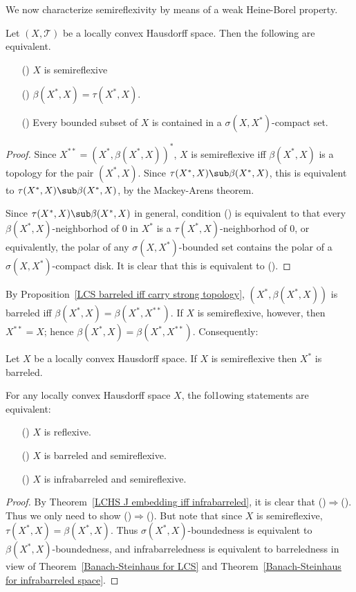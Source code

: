 We now characterize semireflexivity by means of a weak Heine-Borel property.
\begin{theorem}\label{LCHS semireflexive iff}
Let $(X,\mathcal{T})$ be a locally convex Hausdorff space. Then the following are equivalent.
\begin{itemize}
\item[(\rmnum{1})] $X$ is semireflexive
\item[(\rmnum{2})] $\beta(X^*,X)=\tau(X^*,X)$.
\item[(\rmnum{3})] Every bounded subset of $X$ is contained in a $\sigma(X,X^*)$-compact set.
\end{itemize}
\end{theorem}
\begin{proof}
Since $X^{**}=(X^*,\beta(X^*,X))^*$, $X$ is semireflexive iff $\beta(X^*,X)$ is a topology for the pair $(X^*,X)$. Since $\tau(X^*,X)\sub\beta(X^*,X)$, this is equivalent to $\tau(X^*,X)\sub\beta(X^*,X)$, by the Mackey-Arens theorem.\par
Since $\tau(X^*,X)\sub\beta(X^*,X)$ in general, condition () is equivalent to that every $\beta(X^*,X)$-neighborhod of $0$ in $X^*$ is a $\tau(X^*,X)$-neighborhod of $0$, or equivalently, the polar of any $\sigma(X,X^*)$-bounded set contains the polar of a $\sigma(X,X^*)$-compact disk. It is clear that this is equivalent to ().
\end{proof}
By Proposition~\ref{LCS barreled iff carry strong topology}, $(X^*,\beta(X^*,X))$ is barreled iff $\beta(X^*,X)=\beta(X^*,X^{**})$. If $X$ is semireflexive, however, then $X^{**}=X$; hence $\beta(X^*,X)=\beta(X^*,X^{**})$. Consequently:
\begin{corollary}\label{LCHS semireflexive X^* is barreled}
Let $X$ be a locally convex Hausdorff space. If $X$ is semireflexive then $X^*$ is barreled.
\end{corollary}
\begin{theorem}\label{LCHS reflexive iff}
For any locally convex Hausdorff space $X$, the fol1owing statements are equivalent:
\begin{itemize}
\item[(\rmnum{1})] $X$ is reflexive.
\item[(\rmnum{2})] $X$ is barreled and semireflexive.
\item[(\rmnum{3})] $X$ is infrabarreled and semireflexive.
\end{itemize}
\end{theorem}
\begin{proof}
By Theorem~\ref{LCHS J embedding iff infrabarreled}, it is clear that ()$\Rightarrow$(). Thus we only need to show ()$\Rightarrow$(). But note that since $X$ is semireflexive, $\tau(X^*,X)=\beta(X^*,X)$. Thus $\sigma(X^*,X)$-boundedness is equivalent to $\beta(X^*,X)$-boundedness, and infrabarreledness is equivalent to barreledness in view of Theorem~\ref{Banach-Steinhaus for LCS} and Theorem~\ref{Banach-Steinhaus for infrabarreled space}.
\end{proof}
